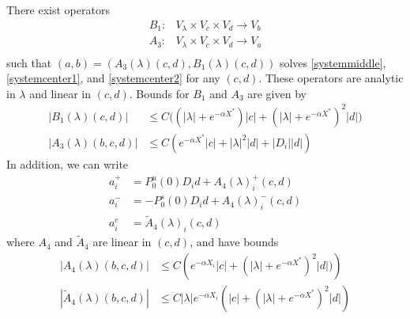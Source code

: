 \documentclass[thesis.tex]{subfiles}
\begin{document}
\begin{lemma}\label{Zinv2}
There exist operators
\begin{align*}
B_1: &V_\lambda \times V_c \times V_d \rightarrow V_b \\
A_3: &V_\lambda \times V_c \times V_d \rightarrow V_a \\
\end{align*}
such that $( a, b ) = ( A_3(\lambda)(c, d), B_1(\lambda)(c, d) )$ solves \eqref{systemmiddle}, \eqref{systemcenter1}, and \eqref{systemcenter2} for any $(c, d)$. These operators are analytic in $\lambda$ and linear in $(c, d)$. Bounds for $B_1$ and $A_3$ are given by
\begin{align}
|B_1(\lambda)(c, d)| &\leq C\Big( (|\lambda|+e^{-\alpha X^*})|c| + (|\lambda| + e^{-\alpha X^*})^2 |d| \Big) \label{B1bound} \\
|A_3(\lambda)(b, c, d)| &\leq C \left( e^{-\alpha X^*} |c| + |\lambda|^2 |d| + |D_i||d| \right) \label{A3bound} 
\end{align} 
In addition, we can write
\begin{align*}
a_i^+ &= P_0^u(0) D_i d + A_4(\lambda)_i^+(c, d) \\
a_i^- &= -P_0^s(0) D_i d + A_4(\lambda)_i^-(c, d) \\
a_i^c &= \tilde{A}_4(\lambda)_i(c, d) 
\end{align*}
where $A_4$ and $\tilde{A}_4$ are linear in $(c, d)$, and have bounds
\begin{align}
|A_4(\lambda)(b, c, d)|
&\leq C \left( e^{-\alpha X_i}|c| + (|\lambda| + e^{-\alpha X^*})^2 |d| ) \right)  \label{A4bound} \\
|\tilde{A}_4(\lambda)(b, c, d)| &\leq C |\lambda| e^{-\alpha X_i} \left( |c| + (|\lambda| + e^{-\alpha X^*})^2  |d| \right) \label{tildeA4bound}
\end{align}


\end{lemma}
\end{document}
